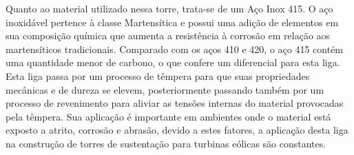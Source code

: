    Quanto ao material utilizado nessa torre, trata-se de um Aço Inox 415. O aço inoxidável pertence à classe Martensítica e possui uma adição de elementos em sua composição química que aumenta a resistência à corrosão em relação aos martensíticos tradicionais. Comparado com os aços 410 e 420, o aço 415 contém uma quantidade menor de carbono, o que confere um diferencial para esta liga. Esta liga passa por um processo de têmpera para  que suas propriedades mecânicas e de dureza se elevem, posteriormente passando também por um processo de revenimento para aliviar as tensões internas do material provocadas pela têmpera. Sua aplicação é importante em ambientes onde o material está exposto a atrito, corrosão e abrasão, devido a estes fatores, a aplicação desta liga na construção de torres de sustentação para turbinas eólicas são constantes.\footnotemark
   
   
   